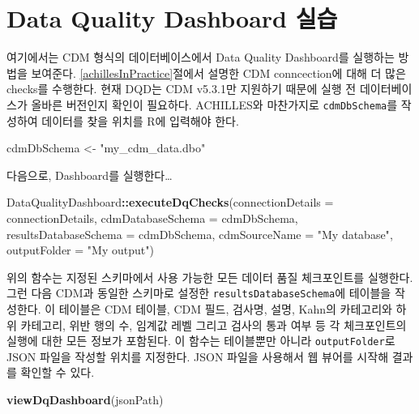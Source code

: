 \documentclass[10.5pt]{book}
\newenvironment{Shaded}{\begin{snugshade}}{\end{snugshade}}
\newcommand{\KeywordTok}[1]{\textcolor[rgb]{0.13,0.29,0.53}{\textbf{#1}}}
\newcommand{\DataTypeTok}[1]{\textcolor[rgb]{0.13,0.29,0.53}{#1}}
\newcommand{\StringTok}[1]{\textcolor[rgb]{0.31,0.60,0.02}{#1}}
\newcommand{\OperatorTok}[1]{\textcolor[rgb]{0.81,0.36,0.00}{\textbf{#1}}}
\newcommand{\NormalTok}[1]{#1}
\theoremstyle{definition}
\theoremstyle{definition}
\theoremstyle{definition}
\theoremstyle{remark}
\begin{document}
\section{Data Quality Dashboard 실습}\label{dqdInPractice}

여기에서는 CDM 형식의 데이터베이스에서 Data Quality Dashboard를 실행하는
방법을 보여준다. \ref{achillesInPractice}절에서 설명한 CDM conncection에
대해 더 많은 checks를 수행한다. 현재 DQD는 CDM v5.3.1만 지원하기 때문에
실행 전 데이터베이스가 올바른 버전인지 확인이 필요하다. ACHILLES와
마찬가지로 \texttt{cdmDbSchema}를 작성하여 데이터를 찾을 위치를 R에
입력해야 한다.

\begin{Shaded}
\begin{Highlighting}[]
\NormalTok{cdmDbSchema <-}\StringTok{ "my_cdm_data.dbo"}
\end{Highlighting}
\end{Shaded}

다음으로, Dashboard를 실행한다\ldots{}

\begin{Shaded}
\begin{Highlighting}[]
\NormalTok{DataQualityDashboard}\OperatorTok{::}\KeywordTok{executeDqChecks}\NormalTok{(}\DataTypeTok{connectionDetails =}\NormalTok{ connectionDetails,}
                                      \DataTypeTok{cdmDatabaseSchema =}\NormalTok{ cdmDbSchema,}
                                      \DataTypeTok{resultsDatabaseSchema =}\NormalTok{ cdmDbSchema,}
                                      \DataTypeTok{cdmSourceName =} \StringTok{"My database"}\NormalTok{,}
                                      \DataTypeTok{outputFolder =} \StringTok{"My output"}\NormalTok{)}
\end{Highlighting}
\end{Shaded}

위의 함수는 지정된 스키마에서 사용 가능한 모든 데이터 품질 체크포인트를
실행한다. 그런 다음 CDM과 동일한 스키마로 설정한
\texttt{resultsDatabaseSchema}에 테이블을 작성한다. 이 테이블은 CDM
테이블, CDM 필드, 검사명, 설명, Kahn의 카테고리와 하위 카테고리, 위반
행의 수, 임계값 레벨 그리고 검사의 통과 여부 등 각 체크포인트의 실행에
대한 모든 정보가 포함된다. 이 함수는 테이블뿐만 아니라
\texttt{outputFolder}로 JSON 파일을 작성할 위치를 지정한다. JSON 파일을
사용해서 웹 뷰어를 시작해 결과를 확인할 수 있다.

\begin{Shaded}
\begin{Highlighting}[]
\KeywordTok{viewDqDashboard}\NormalTok{(jsonPath)}
\end{Highlighting}
\end{Shaded}
\end{document}
